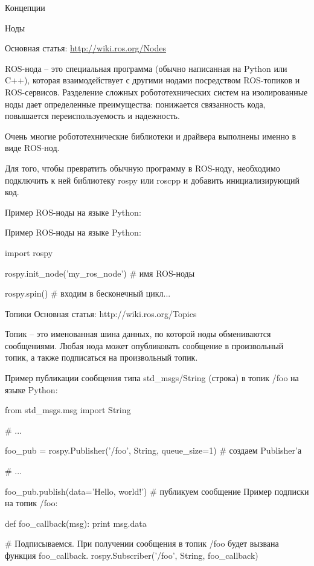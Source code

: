 Концепции

Ноды

Основная статья: \url{http://wiki.ros.org/Nodes}

ROS-нода – это специальная программа (обычно написанная на Python или C++), которая взаимодействует с другими нодами посредством ROS-топиков и ROS-сервисов. Разделение сложных робототехнических систем на изолированные ноды дает определенные преимущества: понижается связанность кода, повышается переиспользуемость и надежность.

Очень многие робототехнические библиотеки и драйвера выполнены именно в виде ROS-нод.

Для того, чтобы превратить обычную программу в ROS-ноду, необходимо подключить к ней библиотеку rospy или roscpp и добавить инициализирующий код.

Пример ROS-ноды на языке Python:


\begin{Program}[H]
	\caption{Пример ROS-ноды на языке Python:} \label{lst:1}
	\begin{MyCode}
import rospy

rospy.init\_node('my\_ros\_node')  # имя ROS-ноды

rospy.spin()  # входим в бесконечный цикл...
	\end{MyCode}
\end{Program}
Топики
Основная статья: http://wiki.ros.org/Topics

Топик – это именованная шина данных, по которой ноды обмениваются сообщениями. Любая нода может опубликовать сообщение в произвольный топик, а также подписаться на произвольный топик.

\begin{Program}[H]
	\caption{Пример публикации сообщения типа std\_msgs/String (строка) в топик /foo на языке Python:} \label{lst:1}
	\begin{MyCode}
from std\_msgs.msg import String

# ...

foo\_pub = rospy.Publisher('/foo', String, queue\_size=1)  # создаем Publisher'а

# ...

foo\_pub.publish(data='Hello, world!')  # публикуем сообщение
Пример подписки на топик /foo:

def foo\_callback(msg):
print msg.data

# Подписываемся. При получении сообщения в топик /foo будет вызвана функция foo\_callback.
rospy.Subscriber('/foo', String, foo\_callback)
	\end{MyCode}
\end{Program}

